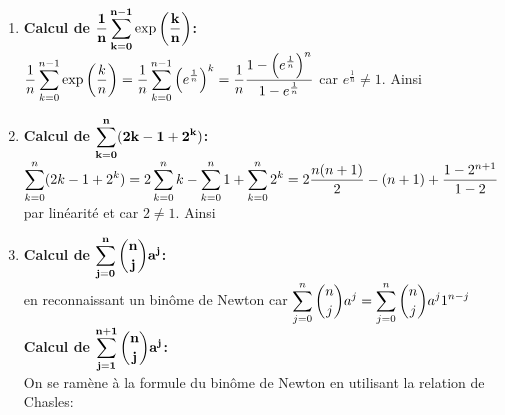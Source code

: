 \documentclass[a4paper, 11pt,reqno]{article}
\begin{document}
\begin{correction}
\begin{enumerate}
\item  \textbf{Calcul de $\mathbf{\displaystyle\frac{1}{n}\displaystyle \sum\limits_{k=0}^{n-1} \exp{\left(\displaystyle\frac{k}{n}\right)} }$:}\\
\noindent $\displaystyle\frac{1}{n}\displaystyle \sum\limits_{k=0}^{n-1} \exp{\left(\displaystyle\frac{k}{n}\right)} = \displaystyle\frac{1}{n}\displaystyle \sum\limits_{k=0}^{n-1} \left( e^{\frac{1}{n}} \right)^{k}=\displaystyle\frac{1}{n} \displaystyle\frac{ 1-\left( e^{\frac{1}{n}} \right)^{n}  }{1-e^{\frac{1}{n}} }$ car $e^{\frac{1}{n}} \not= 1$. Ainsi  


\item  \textbf{Calcul de $\mathbf{\displaystyle \sum\limits_{k=0}^n (2k-1+2^k) }$:}\\
\noindent $\displaystyle \sum\limits_{k=0}^n (2k-1+2^k)=2\displaystyle \sum\limits_{k=0}^n k-\displaystyle \sum\limits_{k=0}^n 1+\displaystyle \sum\limits_{k=0}^n 2^k=2\displaystyle\frac{n(n+1)}{2} -(n+1)+ \displaystyle\frac{1-2^{n+1}}{1-2}$ par  lin\'earit\'e et car $2\not=1$. Ainsi 
\item  \textbf{Calcul de $\mathbf{\displaystyle \sum\limits_{j=0}^n\displaystyle \binom{n}{j}a^j}$:}\\
\noindent {} en reconnaissant un bin\^{o}me de Newton car $\displaystyle \sum\limits_{j=0}^n\binom{n}{j}a^j=\displaystyle \sum\limits_{j=0}^n\binom{n}{j}a^j 1^{n-j}$\\
\noindent  \textbf{Calcul de $\mathbf{\displaystyle \sum\limits_{j=1}^{n+1}\displaystyle \binom{n}{j}a^j}$:}\\
\noindent On se ram\`{e}ne \`{a} la formule du bin\^{o}me de Newton en utilisant la relation de Chasles: 

\end{enumerate}
\end{correction}
\end{document}
